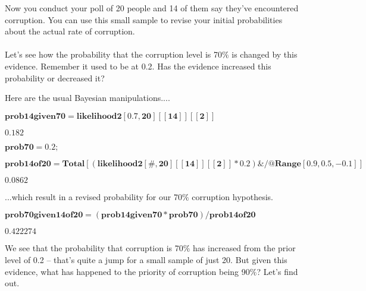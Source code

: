 \documentclass{article}
\begin{document}
\begin{doublespace}
\noindent\(\begin{array}{cc}
  &  \\
\end{array}\)
\end{doublespace}

Now you conduct your poll of 20 people and 14 of them say they{'}ve encountered corruption. You can use this small sample to revise your initial
probabilities about the actual rate of corruption.\\
\\
Let{'}s see how the probability that the corruption level is 70$\%$ is changed by this evidence. Remember it used to be at 0.2. Has the evidence
increased this probability or decreased it? 

Here are the usual Bayesian manipulations....

\begin{doublespace}
\noindent\(\pmb{\text{prob14given70} = \text{likelihood2}[0.7,20][[14]][[2]]}\)
\end{doublespace}

\begin{doublespace}
\noindent\(0.182\)
\end{doublespace}

\begin{doublespace}
\noindent\(\pmb{\text{prob70} = 0.2;}\)
\end{doublespace}

\begin{doublespace}
\noindent\(\pmb{\text{prob14of20} = \text{Total}[(\text{likelihood2}[\#,20][[14]][[2]] * 0.2) \& \text{/@} \text{Range}[0.9,0.5,-0.1]]}\)
\end{doublespace}

\begin{doublespace}
\noindent\(0.0862\)
\end{doublespace}

...which result in a revised probability for our 70$\%$ corruption hypothesis.

\begin{doublespace}
\noindent\(\pmb{\text{prob70given14of20} = (\text{prob14given70} * \text{prob70})/\text{prob14of20}}\)
\end{doublespace}

\begin{doublespace}
\noindent\(0.422274\)
\end{doublespace}

We see that the probability that corruption is 70$\%$ has increased from the prior level of 0.2 -- that{'}s quite a jump for a small sample of just
20. But given this evidence, what has happened to the priority of corruption being 90$\%$? Let{'}s find out.
\end{document}
